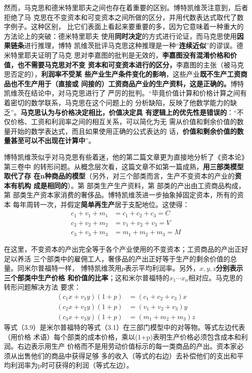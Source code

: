 然而，马克思和德米特里耶夫之间也存在着重要的区别。博特凯维茨注意到，后者拒绝了马
克思在不变资本和可变资本之间所做的区分，并用代数表达式取代了数字例子。这种区别，
比它们表面上看起来要重要的多，因为它意味着一种重大的方法论上的突破：德米特里耶夫
使用\textbf{同时决定}的方式进行论证，而马克思使用\textbf{因果链条}进行推理，博特
凯维茨批评马克思这种推理是一种“\textbf{连续近似}”的谬误。德米特里耶夫证明了马克
思对李嘉图的批判是无效的，\textbf{李嘉图没有混淆价格和价值，也不需要马克思对不变
  资本和可变资本进行的区分，}李嘉图的主张（被马克思否定的），\textbf{利润率不受某
  些产业生产条件变化的影响}，这些产业\textbf{既不生产工资商品也不生产用于（直接或
  间接的）工资商品产业的生产资料，这是正确的。}博特凯维茨在结论中，对马克思进行了
严厉的批判。“毕竟价值计算和价格计算之间有着密切的数学联系，马克思在这个问题上的
分析缺陷，反映了他数学能力的缺乏”。\textbf{马克思认为与价格决定相比，价值决定具
  有逻辑上的优先性是错误的}：“不仅价格、工资和利润率之间的相互关系，可以简化为无
需从价值和剩余价值的数量开始的数学表达式，而且如果使用正确的公式表达的
话，\textbf{价值和剩余价值的数量甚至可以不出现在计算中}”。

博特凯维茨似乎对马克思有些着迷，他的第二篇文章更为直接地分析了《资本论》第三卷中
的转形问题。从概念层次看，这篇文章不如第一篇成熟，\textbf{用三部类模型取代了存
  在n种商品的模型}（另外，对三个部类而言，生产不变资本的产业的\textbf{资本有机构
  成是相同的}）。第 部类生产生产资料，第 部类的产出由工资商品构成，
第 部类生产资本家消费的奢侈品。博特凯维茨进一步抽象掉固定资本，所有的资本
每年周转一次，并假定\textbf{简单再生产}居于支配地位。这使得：
\begin{equation}
\begin{aligned}
  c_1+v_1+m_1 &=c_1+c_2+c_3=C  \\
  c_2+v_2+m_2 &=v_1+v_2+v_3=V  \\
  c_3+v_3+m_3 &=m_1+m_2+m_3=M 
\end{aligned}
\end{equation}

在这里，不变资本的产出完全等于各个产业使用的不变资本；工资商品的产出正好足以养活
三个部类中的雇佣工人，奢侈品的产出正好等于生产的剩余价值的总量。同米尔普福特一样，
博特凯维茨用$p$表示平均利润率。另外，\textbf{$x, y, z$分别表示三个部类中生产价格
  和价值的比率}；这和米尔普福特的$x_1 \cdots x_n$相对应。马克思的转形问题解决方法
要求：
\begin{equation}
\begin{aligned}
  (c_1x+v_1y)(1+p) &=(c_1+c_2+c_3)x  \\
  (c_2x+v_2y)(1+p) &=(v_1+v_2+v_3)y  \\
  (c_3x+v_3y)(1+p) &=(m_1+m_2+m_3)z
\end{aligned}
\end{equation}
等式（3.9）是米尔普福特的等式（3.1）在三部门模型中的对等物。等式左边代表（用价格
术语）每个部类的成本价格，乘以(1+p)表明生产价格必须包含成本和利润。右边表示用生产
价格而不是用劳动价值标示的每一类商品的产出。资本家必须从出售他们的商品中获得足够
多的收入（等式的右边）去补偿他们的支出和平均利润率为p时可获得的利润（等式左边）。


